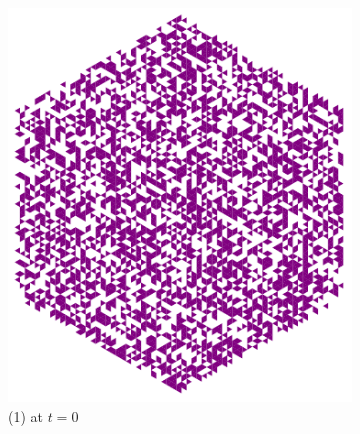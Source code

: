 \documentclass{article}
\begin{document}
\bigskip

\begin{figure}[H]
     \centering
     \begin{subfigure}[b]{0.3\textwidth}
         \centering
         \includegraphics[width=\textwidth]{graphics/behavior/chaos/chaos-1-1.pdf}
         \caption*{(1) at $t=0$}
     \end{subfigure}
     \hspace{0.17\textwidth}
     \begin{subfigure}[b]{0.3\textwidth}
         \centering

\end{subfigure}
\end{figure}
\end{document}
